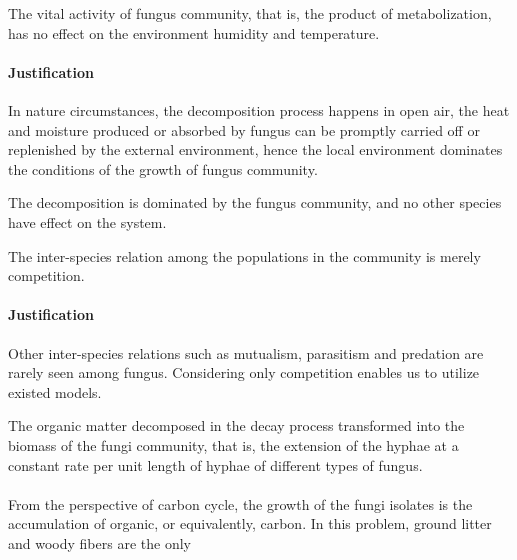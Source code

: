 \begin{definition}
    The vital activity of fungus community, that is, the product of metabolization, has no effect on the environment humidity and temperature.
\end{definition}

\paragraph*{Justification} In nature circumstances, the decomposition process happens in open air, the heat and moisture produced or absorbed by fungus can be promptly carried off or replenished  by the external environment, hence the local environment dominates the conditions of the growth of fungus community.


\begin{definition}
    The decomposition is dominated by the fungus community, and no other species have effect on the system.
\end{definition}

\begin{definition}
    The inter-species relation among the populations in the community is merely competition.
\end{definition}

\paragraph*{Justification} Other inter-species relations such as mutualism, parasitism and predation are rarely seen among fungus. Considering only competition enables us to utilize existed models.


\begin{definition}
    The organic matter decomposed in the decay process transformed into the biomass of the fungi community, that is, the extension of the hyphae at a constant rate per unit length of hyphae of different types of fungus.
\end{definition}

\paragraph*{}
From the perspective of carbon cycle, the growth of the fungi isolates is the accumulation of organic, or equivalently, carbon. In this problem, ground litter and woody fibers are the only


